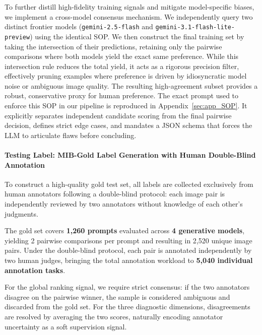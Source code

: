 To further distill high-fidelity training signals and mitigate model-specific biases, we implement a cross-model consensus mechanism. We independently query two distinct frontier models (\texttt{gemini-2.5-flash} and \texttt{gemini-3.1-flash-lite-preview}) using the identical SOP. We then construct the final training set by taking the intersection of their predictions, retaining only the pairwise comparisons where both models yield the exact same preference. While this intersection rule reduces the total yield, it acts as a rigorous precision filter, effectively pruning examples where preference is driven by idiosyncratic model noise or ambiguous image quality. The resulting high-agreement subset provides a robust, conservative proxy for human preference. The exact prompt used to enforce this SOP in our pipeline is reproduced in Appendix~\ref{sec:app_SOP}. It explicitly separates independent candidate scoring from the final pairwise decision, defines strict edge cases, and mandates a JSON schema that forces the LLM to articulate flaws before concluding.


\paragraph{Testing Label: MIB-Gold Label Generation with Human Double-Blind Annotation}
To construct a high-quality gold test set, all labels are collected exclusively from human annotators following a double-blind protocol: each image pair is independently reviewed by two annotators without knowledge of each other's judgments.

The gold set covers \textbf{1{,}260 prompts} evaluated across \textbf{4 generative models}, yielding 2 pairwise comparisons per prompt and resulting in 2{,}520 unique image pairs. Under the double-blind protocol, each pair is annotated independently by two human judges, bringing the total annotation workload to \textbf{5{,}040 individual annotation tasks}.

For the global ranking signal, we require strict consensus: if the two annotators disagree on the pairwise winner, the sample is considered ambiguous and discarded from the gold set. For the three diagnostic dimensions, disagreements are resolved by averaging the two scores, naturally encoding annotator uncertainty as a soft supervision signal.







